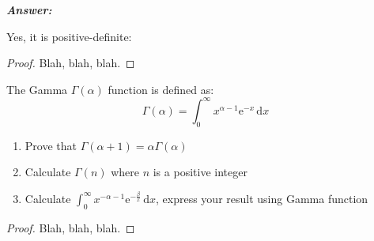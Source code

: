\documentclass[12pt]{article}
\newenvironment{question}[2][Question]{\begin{trivlist}
\item[\hskip \labelsep {\bfseries #1}\hskip \labelsep {\bfseries #2.}]}{\end{trivlist}}
\begin{document}
\textbf{\emph{Answer:} }

Yes, it is positive-definite:
\begin{proof}
Blah, blah, blah.  
\end{proof}


\bigskip
\bigskip
\begin{question}{1. 5} 
The Gamma $\Gamma(\alpha)$ function is defined as:
\begin{equation*}
\Gamma(\alpha) = \int_0^\infty x^{\alpha - 1}\mathrm{e}^{-x}\,\mathrm{d}x
\end{equation*}

\begin{enumerate}
  \item Prove that $\Gamma(\alpha + 1) = \alpha\Gamma(\alpha)$
  \item Calculate $\Gamma(n)$ where $n$ is a positive integer
  \item Calculate $\int_0^\infty x^{-\alpha - 1}\mathrm{e}^{-\frac{\beta}{x}}\,\mathrm{d}x$, express your result using Gamma function
\end{enumerate}

\end{question}

\begin{proof}
Blah, blah, blah.  
\end{proof}
\end{document}
